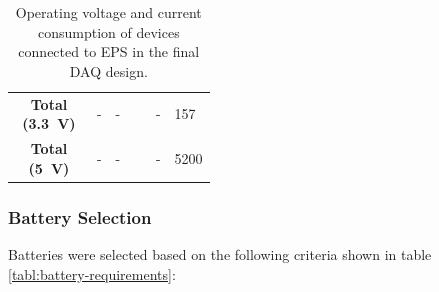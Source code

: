 \documentclass{report}
\begin{document}
\begin{table}[H]
\begin{tabular}{|c|c|L{0.2\linewidth}|c|L{0.2\linewidth}|}
    \hline
    \textbf{Total (\SI{3.3}{\volt})} & -                             & -                                              & -                 & 157                                       \\
    \textbf{Total (\SI{5}{\volt})}   & -                             & -                                              & -                 & 5200                                      \\
    \hline
  \end{tabular}
  \caption{Operating voltage and current consumption of devices connected to EPS in the final DAQ design.}
  \label{tabl:eps-power-budget}
\end{table}

\subsubsection{Battery Selection}
\label{sec:battery-selection}

Batteries were selected based on the following criteria shown in table \ref{tabl:battery-requirements}:
\end{document}
